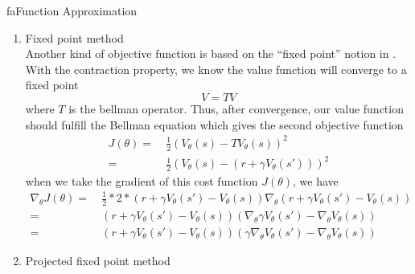 \documentclass[9pt]{article}
\begin{document}
\begin{topic}{fa}{Function Approximation}
\begin{enumerate}
However, this direct method has some issue with convergence. 
\item Fixed point method\\
Another kind of objective function is based on the ``fixed point'' notion in . With the contraction property, we know the value function will converge to a fixed point
\[
	V = TV
\]
where $T$ is the bellman operator. Thus, after convergence, our value function should fulfill the Bellman equation which gives the second objective function
\[
\begin{split}
J(\theta) = &\ \frac{1}{2}(V_{\theta}(s) - TV_{\theta}(s))^2\\
= &\ \frac{1}{2}(V_{\theta}(s)-(r+\gamma V_{\theta}(s')))^2
\end{split}
\]
when we take the gradient of this cost function $J(\theta)$, we have
\[
\begin{split}
\nabla_{\theta} J(\theta) = &\ \frac{1}{2} * 2 * (r+\gamma V_{\theta}(s') - V_{\theta}(s)) \nabla_{\theta} (r+\gamma V_{\theta}(s') - V_{\theta}(s))\\
= &\ (r+\gamma V_{\theta}(s') - V_{\theta}(s)) (\nabla_{\theta} \gamma V_{\theta}(s') - \nabla_{\theta}  V_{\theta}(s))\\
= &\ (r+\gamma V_{\theta}(s') - V_{\theta}(s)) (\gamma \nabla_{\theta} V_{\theta}(s') - \nabla_{\theta}  V_{\theta}(s))
\end{split}
\]

\item Projected fixed point method 
\end{enumerate}
\end{topic}
\end{document}
